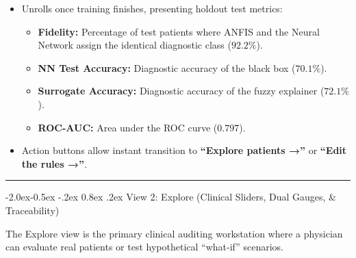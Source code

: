 \documentclass[10pt,a4paper]{article}
\makeatletter
\renewcommand\subsubsection{\@startsection{subsubsection}{3}{\z@}%
                                     {-2.0ex\@plus -0.5ex \@minus -.2ex}%
                                     {0.8ex \@plus .2ex}%
                                     {\normalfont\normalsize\bfseries\color{accent}}}
\providecommand{\tightlist}{\setlength{\itemsep}{1pt}\setlength{\parskip}{1pt}}
\makeatother
\begin{document}
\begin{itemize}
  \begin{itemize}
  \tightlist
  \item
    Unrolls once training finishes, presenting holdout test metrics:

    \begin{itemize}
    \tightlist
    \item
      \textbf{Fidelity:} Percentage of test patients where ANFIS and the
      Neural Network assign the identical diagnostic class (\(92.2\%\)).
    \item
      \textbf{NN Test Accuracy:} Diagnostic accuracy of the black box
      (\(70.1\%\)).
    \item
      \textbf{Surrogate Accuracy:} Diagnostic accuracy of the fuzzy
      explainer (\(72.1\%\)).
    \item
      \textbf{ROC-AUC:} Area under the ROC curve (\(0.797\)).
    \end{itemize}
  \item
    Action buttons allow instant transition to \textbf{``Explore
    patients →''} or \textbf{``Edit the rules →''}.
  \end{itemize}
\end{itemize}

\begin{center}\rule{0.5\linewidth}{0.5pt}\end{center}

\subsubsection{View 2: Explore (Clinical Sliders, Dual Gauges, \&
Traceability)}\label{view-2-explore-clinical-sliders-dual-gauges-traceability}

The Explore view is the primary clinical auditing workstation where a
physician can evaluate real patients or test hypothetical ``what-if''
scenarios.
\end{document}
